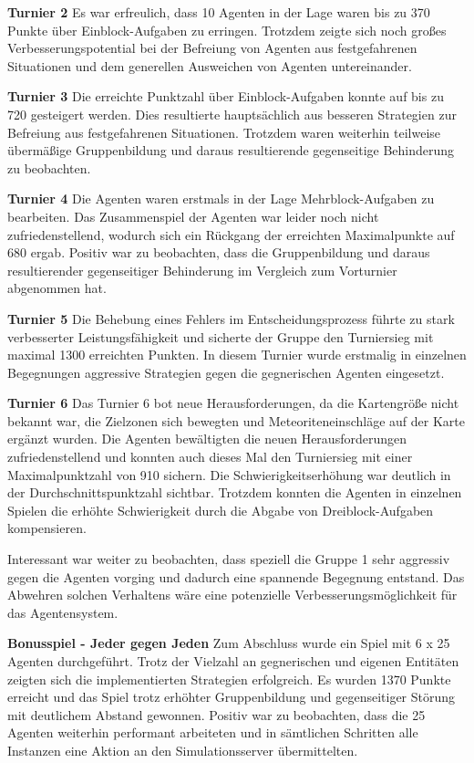\documentclass[runningheads]{llncs}
\begin{document}
\textbf{Turnier 2}
Es war erfreulich, dass 10 Agenten in der Lage waren bis zu 370 Punkte über Einblock-Aufgaben zu erringen. Trotzdem zeigte sich noch großes Verbesserungspotential bei der Befreiung von Agenten aus festgefahrenen Situationen und dem generellen Ausweichen von Agenten untereinander.

\textbf{Turnier 3}
Die erreichte Punktzahl über Einblock-Aufgaben konnte auf bis zu 720 gesteigert werden. Dies resultierte hauptsächlich aus besseren Strategien zur Befreiung aus festgefahrenen Situationen. Trotzdem waren weiterhin teilweise übermäßige Gruppenbildung und daraus resultierende gegenseitige Behinderung zu beobachten.

\textbf{Turnier 4}
Die Agenten waren erstmals in der Lage Mehrblock-Aufgaben zu bearbeiten. Das Zusammenspiel der Agenten war leider noch nicht zufriedenstellend, wodurch sich ein Rückgang der erreichten Maximalpunkte auf 680 ergab. Positiv war zu beobachten, dass die Gruppenbildung und daraus resultierender gegenseitiger Behinderung im Vergleich zum Vorturnier abgenommen hat.

\textbf{Turnier 5}
 Die Behebung eines Fehlers im Entscheidungsprozess führte zu stark verbesserter Leistungsfähigkeit und sicherte der Gruppe den Turniersieg mit maximal 1300 erreichten Punkten. In diesem Turnier wurde erstmalig in einzelnen Begegnungen aggressive Strategien gegen die gegnerischen Agenten eingesetzt.

\textbf{Turnier 6}
Das Turnier 6 bot neue Herausforderungen, da die Kartengröße nicht bekannt war, die Zielzonen sich bewegten und Meteoriteneinschläge auf der Karte ergänzt wurden. Die Agenten bewältigten die neuen Herausforderungen zufriedenstellend und konnten auch dieses Mal den Turniersieg mit einer Maximalpunktzahl von 910 sichern. Die Schwierigkeitserhöhung war deutlich in der Durchschnittspunktzahl sichtbar. Trotzdem konnten die Agenten in einzelnen Spielen die erhöhte Schwierigkeit durch die Abgabe von Dreiblock-Aufgaben kompensieren.

Interessant war weiter zu beobachten, dass speziell die Gruppe 1 sehr aggressiv gegen die Agenten vorging und dadurch eine spannende Begegnung entstand. Das Abwehren solchen Verhaltens wäre eine potenzielle Verbesserungsmöglichkeit für das Agentensystem. 

\textbf{Bonusspiel - Jeder gegen Jeden}
Zum Abschluss wurde ein Spiel mit 6 x 25 Agenten durchgeführt. Trotz der Vielzahl an gegnerischen und eigenen Entitäten zeigten sich die implementierten Strategien erfolgreich. Es wurden 1370 Punkte erreicht und das Spiel trotz erhöhter Gruppenbildung und gegenseitiger Störung mit deutlichem Abstand gewonnen.
Positiv war zu beobachten, dass die 25 Agenten weiterhin performant arbeiteten und in sämtlichen Schritten alle Instanzen eine Aktion an den Simulationsserver übermittelten.
\end{document}
